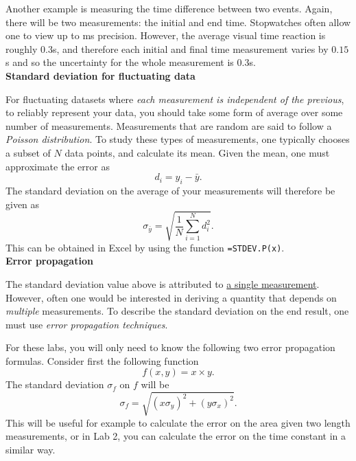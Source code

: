 \documentclass[12pt]{report}
\begin{document}
Another example is measuring the time difference between two events. Again, there will be two measurements: the initial and end time. Stopwatches often allow one to view up to ms precision. However, the average visual time reaction is roughly $0.3$s, and therefore each initial and final time measurement varies by $0.15$s and so the uncertainty for the whole measurement is $0.3$s. \\

\noindent \large \textbf{Standard deviation for fluctuating data} \normalsize

For fluctuating datasets where \textit{each measurement is independent of the previous}, to reliably represent your data, you should take some form of average over some number of measurements. Measurements that are random are said to follow a \textit{Poisson distribution}. To study these types of measurements, one typically chooses a subset of $N$ data points, and calculate its mean. Given the mean, one must approximate the error as
\begin{equation}
d_i = y_i - \bar{y}.
\end{equation}
The standard deviation on the average of your measurements will therefore be given as
\begin{equation}
\sigma_{\bar{y}} = \sqrt{ \frac{1}{N} \displaystyle \sum_{i=1}^{N} d_i^2}.
\label{Eq:STDev.P}
\end{equation}
This can be obtained in Excel by using the function \verb|=STDEV.P(x)|. \\

\noindent \large \textbf{Error propagation} \normalsize

The standard deviation value above is attributed to \underline{a single measurement}. However, often one would be interested in deriving a quantity that depends on \textit{multiple} measurements. To describe the standard deviation on the end result, one must use \textit{error propagation techniques}.

For these labs, you will only need to know the following two error propagation formulas. Consider first the following function
\begin{equation}
f(x,y) = x \times y.
\label{Eq:f=xy}
\end{equation}
The standard deviation $\sigma_f$ on $f$ will be
\begin{equation}
\sigma_f = \sqrt{ (x \sigma_y)^2 + (y \sigma_x)^2}.
\label{Eq:product error}
\end{equation}
This will be useful for example to calculate the error on the area given two length measurements, or in Lab 2, you can calculate the error on the time constant in a similar way.
\end{document}
